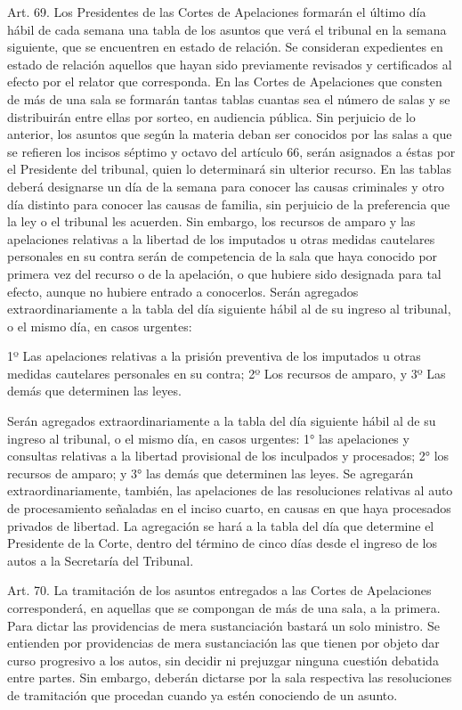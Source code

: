     Art. 69. Los Presidentes de las Cortes de Apelaciones formarán el último día hábil de cada semana una tabla de los asuntos que verá el tribunal en la semana siguiente, que se encuentren en estado de relación. Se consideran expedientes en estado de relación aquellos que hayan sido previamente revisados y certificados al efecto por el relator que corresponda.
    En las Cortes de Apelaciones que consten de más de una sala se formarán tantas tablas cuantas sea el número de salas y se distribuirán entre ellas por sorteo, en audiencia pública. Sin perjuicio de lo anterior, los asuntos que según la materia deban ser conocidos por las salas a que se refieren los incisos séptimo y octavo del artículo 66, serán asignados a éstas por el Presidente del tribunal, quien lo determinará sin ulterior recurso.
    En las tablas deberá designarse un día de la semana para conocer las causas criminales y otro día distinto para conocer las causas de familia, sin perjuicio de la preferencia que la ley o el tribunal les acuerden.
    Sin embargo, los recursos de amparo y las apelaciones relativas a la libertad de los imputados u otras medidas cautelares personales en su contra serán de competencia de la sala que haya conocido por primera vez del recurso o de la apelación, o que hubiere sido designada para tal efecto, aunque no hubiere entrado a conocerlos.
    Serán agregados extraordinariamente a la tabla del día siguiente hábil al de su ingreso al tribunal, o el mismo día, en casos urgentes:

    1º Las apelaciones relativas a la prisión preventiva de los imputados u otras medidas cautelares personales en su contra;
    2º Los recursos de amparo, y
    3º Las demás que determinen las leyes.
   
    Serán agregados extraordinariamente a la tabla del día siguiente hábil al de su ingreso al tribunal, o el mismo día, en casos urgentes: 1° las apelaciones y consultas relativas a la libertad provisional de los inculpados y procesados; 2° los recursos de amparo; y 3° las demás que determinen las leyes.
    Se agregarán extraordinariamente, también, las apelaciones de las resoluciones relativas al auto de procesamiento señaladas en el inciso cuarto, en causas en que haya procesados privados de libertad. La agregación se hará a la tabla del día que determine el Presidente de la Corte, dentro del término de cinco días desde el ingreso de los autos a la Secretaría del Tribunal.



    Art. 70. La tramitación de los asuntos entregados a las Cortes de Apelaciones corresponderá, en aquellas que se compongan de más de una sala, a la primera.
    Para dictar las providencias de mera sustanciación bastará un solo ministro.
    Se entienden por providencias de mera sustanciación las que tienen por objeto dar curso progresivo a los autos, sin decidir ni prejuzgar ninguna cuestión debatida entre partes.
    Sin embargo, deberán dictarse por la sala respectiva las resoluciones de tramitación que procedan cuando ya estén conociendo de un asunto.



